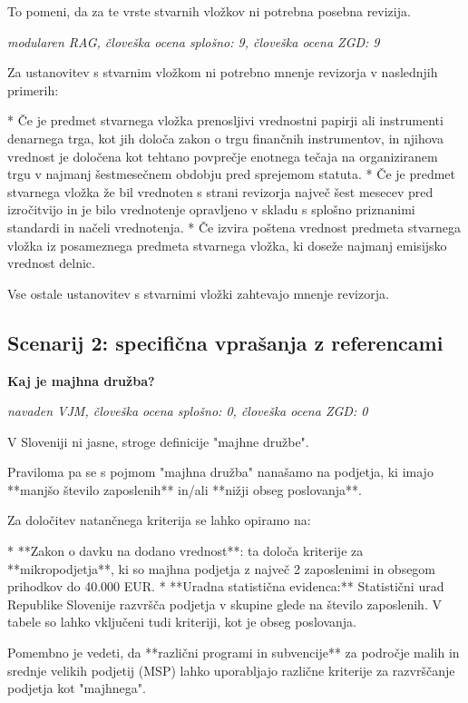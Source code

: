 \documentclass[a4paper,12pt,openright]{book}
\begin{document}
To pomeni, da za te vrste stvarnih vložkov ni potrebna posebna revizija.

\vspace{0.5cm}
\textit{modularen RAG, človeška ocena splošno: 9, človeška ocena ZGD: 9}

Za ustanovitev s stvarnim vložkom ni potrebno mnenje revizorja v naslednjih primerih:

* Če je predmet stvarnega vložka prenosljivi vrednostni papirji ali instrumenti denarnega trga, kot jih določa zakon o trgu finančnih instrumentov, in njihova vrednost je določena kot tehtano povprečje enotnega tečaja na organiziranem trgu v najmanj šestmesečnem obdobju pred sprejemom statuta.
* Če je predmet stvarnega vložka že bil vrednoten s strani revizorja največ šest mesecev pred izročitvijo in je bilo vrednotenje opravljeno v skladu s splošno priznanimi standardi in načeli vrednotenja.
* Če izvira poštena vrednost predmeta stvarnega vložka iz posameznega predmeta stvarnega vložka, ki doseže najmanj emisijsko vrednost delnic.

Vse ostale ustanovitev s stvarnimi vložki zahtevajo mnenje revizorja.

\subsection*{Scenarij 2: specifična vprašanja z referencami}

\textbf{Kaj je majhna družba?}

\textit{navaden VJM, človeška ocena splošno: 0, človeška ocena ZGD: 0}

V Sloveniji ni jasne, stroge definicije "majhne družbe".

Praviloma pa se s pojmom "majhna družba" nanašamo na podjetja, ki imajo **manjšo število zaposlenih** in/ali **nižji obseg poslovanja**.

Za določitev natančnega kriterija se lahko opiramo na:

* **Zakon o davku na dodano vrednost**: ta določa kriterije za **mikropodjetja**, ki so majhna podjetja z največ 2 zaposlenimi in obsegom prihodkov do 40.000 EUR.
* **Uradna statistična evidenca:** Statistični urad Republike Slovenije razvršča podjetja v skupine glede na število zaposlenih. V tabele so lahko vključeni tudi kriteriji, kot je obseg poslovanja.

Pomembno je vedeti, da **različni programi in subvencije** za področje malih in srednje velikih podjetij (MSP) lahko uporabljajo različne kriterije za razvrščanje podjetja kot "majhnega".
\end{document}

